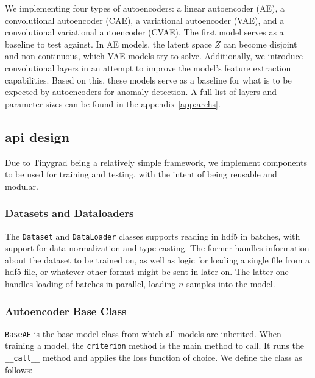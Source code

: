 We implementing four types of autoencoders: a linear autoencoder (AE), a convolutional autoencoder (CAE), a variational autoencoder (VAE), and a convolutional variational autoencoder (CVAE). The first model serves as a baseline to test against. In AE models, the latent space $Z$ can become disjoint and non-continuous, which VAE models try to solve. Additionally, we introduce convolutional layers in an attempt to improve the model's feature extraction capabilities. Based on this, these models serve as a baseline for what is to be expected by autoencoders for anomaly detection. A full list of layers and parameter sizes can be found in the appendix \ref{app:archs}. \\

\subsection{\acrshort{api} design}

Due to Tinygrad being a relatively simple framework, we implement components to be used for training and testing, with the intent of being reusable and modular.

\subsubsection{Datasets and Dataloaders}

The \texttt{Dataset} and \texttt{DataLoader} classes supports reading in \acrshort{hdf5} in batches, with support for data normalization and type casting. The former handles information about the dataset to be trained on, as well as logic for loading a single file from a \acrshort{hdf5} file, or whatever other format might be sent in later on. The latter one handles loading of batches in parallel, loading $n$ samples into the model.

\subsubsection{Autoencoder Base Class}

\lstinline{BaseAE} is the base model class from which all models are inherited. When training a model, the \lstinline{criterion} method is the main method to call. It runs the \lstinline{__call__} method and applies the loss function of choice. We define the class as follows:



